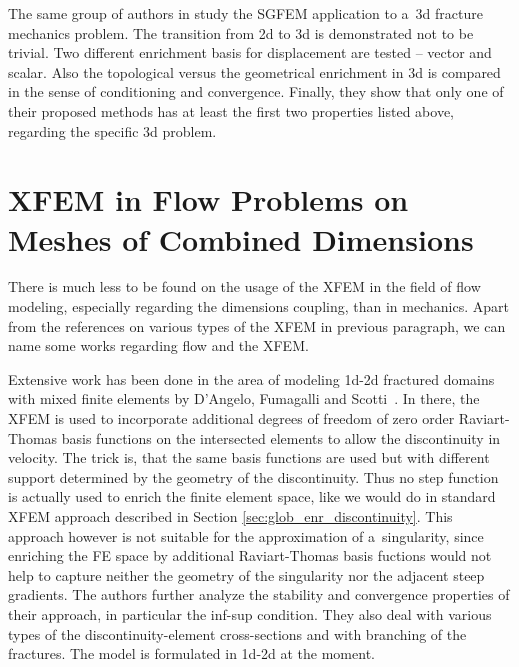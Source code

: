 The same group of authors in \cite{gupta_3d_fracture_2015} study the SGFEM application to a~3d fracture mechanics problem.
The transition from 2d to 3d is demonstrated not to be trivial. Two different enrichment basis for displacement are tested -- vector and scalar.
Also the topological versus the geometrical enrichment in 3d is compared in the sense of conditioning and convergence.
Finally, they show that only one of their proposed methods has at least the first two properties listed above,
regarding the specific 3d problem.




\section{XFEM in Flow Problems on Meshes of Combined Dimensions} \label{sec:soa_xfem_combined}


There is much less to be found on the usage of the XFEM in the field of flow modeling, especially regarding the dimensions coupling,
than in mechanics.
Apart from the references on various types of the XFEM in previous paragraph, we can name some works regarding flow and the XFEM.

Extensive work has been done in the area of modeling 1d-2d fractured domains with mixed finite 
elements by D'Angelo, Fumagalli and Scotti~\cite{fumagalli_numerical_2012, dangelo_mixed_2012, fumagalli_efficient_2014}. 
In there, the XFEM is used to incorporate additional degrees of freedom of zero order Raviart-Thomas basis 
functions on the intersected elements to allow the discontinuity in velocity.
The trick is, that the same basis functions are used but with different support determined by the geometry of the discontinuity.
Thus no step function is actually used to enrich the finite element space,
like we would do in standard XFEM approach described in Section \ref{sec:glob_enr_discontinuity}.
This approach however is not suitable for the approximation of a~singularity,
since enriching the FE space by additional Raviart-Thomas basis fuctions would not help to capture neither the geometry of the singularity
nor the adjacent steep gradients.
The authors further analyze the stability and convergence properties of their approach, in particular the inf-sup condition.
They also deal with various types of the discontinuity-element cross-sections and with branching of the fractures.
The model is formulated in 1d-2d at the moment.

